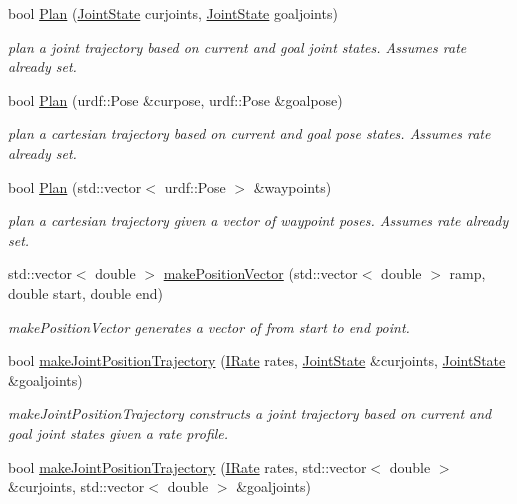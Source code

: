 \begin{DoxyCompactItemize}
bool \hyperlink{classTrajectoryMaker_aa107c5ae3573addb3bd93fa75814b4ab}{Plan} (\hyperlink{RCS_8h_aa4adb93a26caa4dacba9c9614e283245}{Joint\-State} curjoints, \hyperlink{RCS_8h_aa4adb93a26caa4dacba9c9614e283245}{Joint\-State} goaljoints)
\begin{DoxyCompactList}\small\item\em plan a joint trajectory based on current and goal joint states. Assumes rate already set. \end{DoxyCompactList}\item 
bool \hyperlink{classTrajectoryMaker_a13d043e95456481ff6640ce849f9dc3c}{Plan} (urdf\-::\-Pose \&curpose, urdf\-::\-Pose \&goalpose)
\begin{DoxyCompactList}\small\item\em plan a cartesian trajectory based on current and goal pose states. Assumes rate already set. \end{DoxyCompactList}\item 
bool \hyperlink{classTrajectoryMaker_a864abb96bb5c6e72cd3bd94f955cfd9e}{Plan} (std\-::vector$<$ urdf\-::\-Pose $>$ \&waypoints)
\begin{DoxyCompactList}\small\item\em plan a cartesian trajectory given a vector of waypoint poses. Assumes rate already set. \end{DoxyCompactList}\item 
std\-::vector$<$ double $>$ \hyperlink{classTrajectoryMaker_aef3a8579c6f39bb357e41b9006229a2a}{make\-Position\-Vector} (std\-::vector$<$ double $>$ ramp, double start, double end)
\begin{DoxyCompactList}\small\item\em make\-Position\-Vector generates a vector of from start to end point. \end{DoxyCompactList}\item 
bool \hyperlink{classTrajectoryMaker_a6866c32dff71e077280ea82f6f8f9e16}{make\-Joint\-Position\-Trajectory} (\hyperlink{classIRate}{I\-Rate} rates, \hyperlink{RCS_8h_aa4adb93a26caa4dacba9c9614e283245}{Joint\-State} \&curjoints, \hyperlink{RCS_8h_aa4adb93a26caa4dacba9c9614e283245}{Joint\-State} \&goaljoints)
\begin{DoxyCompactList}\small\item\em make\-Joint\-Position\-Trajectory constructs a joint trajectory based on current and goal joint states given a rate profile. \end{DoxyCompactList}\item 
bool \hyperlink{classTrajectoryMaker_a0de61ca56c1cf276adc4efe1be1f3672}{make\-Joint\-Position\-Trajectory} (\hyperlink{classIRate}{I\-Rate} rates, std\-::vector$<$ double $>$ \&curjoints, std\-::vector$<$ double $>$ \&goaljoints)

\end{DoxyCompactItemize}
